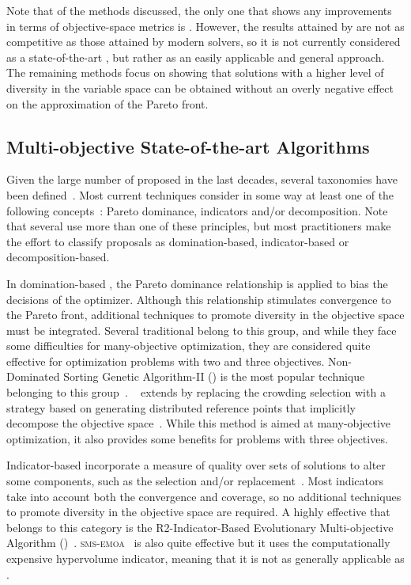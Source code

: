 Note that of the methods discussed, the only one that shows any improvements in terms of objective-space metrics is \GDEA{}.
%
However, the results attained by \GDEA{} are not as competitive as those attained by modern solvers, so it is not currently
considered as a state-of-the-art \MOEA{}, but rather as an easily applicable and general approach.
%
The remaining methods focus on showing that solutions with a higher level of diversity in the variable space
can be obtained without an overly negative effect
on the approximation of the Pareto front.


\subsection{Multi-objective State-of-the-art Algorithms}

Given the large number of \MOEAS{} proposed in the last decades, several taxonomies have been defined~\cite{bechikh2016recent}.
%
Most current techniques consider in some way at least one of the following concepts~\cite{trivedi2016survey}:
Pareto dominance, indicators and/or decomposition.
%
Note that several \MOEAS{} use more than one of these principles, but most practitioners make the effort to classify
proposals as domination-based, indicator-based or decomposition-based.

In domination-based \MOEAS{}, the Pareto dominance relationship is applied to bias the decisions of the optimizer.
%
Although this relationship stimulates convergence to the Pareto front, additional techniques to promote
diversity in the objective space must be integrated.
%
Several traditional \MOEAS{} belong to this group, and while they face some difficulties for many-objective
optimization, they are considered quite effective for optimization problems with two and three objectives.
%
Non-Dominated Sorting Genetic Algorithm-II (\NSGAII{}) is the most popular technique belonging to this group~\cite{deb2002fast}.
%
\NSGAIII{}~\cite{deb2013evolutionary} extends \NSGAII{} by replacing the crowding selection with a strategy 
based on generating distributed reference points that implicitly decompose the objective space~\cite{trivedi2016survey}.
%
While this method is aimed at many-objective optimization, it also provides some benefits for problems with three objectives.

Indicator-based \MOEAS{} incorporate a measure of quality over sets of solutions to alter some components, such as the 
selection and/or replacement~\cite{zitzler2004indicator}.
%
Most indicators take into account both the convergence and coverage, so no additional techniques to promote diversity
in the objective space are required.
%
A highly effective \MOEA{} that belongs to this category is the R2-Indicator-Based Evolutionary Multi-objective 
Algorithm (\RMOEA{})~\cite{trautmann2013r2}.
%
\textsc{sms-emoa}~\cite{beume:07} is also quite effective 
but it uses the computationally expensive hypervolume indicator, meaning that it is not as generally applicable as \RMOEA{}.

